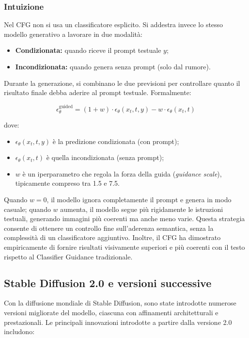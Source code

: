 \subsubsection{Intuizione}

Nel CFG non si usa un classificatore esplicito. Si addestra invece lo stesso modello generativo a lavorare in due modalità:
\begin{itemize}
    \item \textbf{Condizionata:} quando riceve il prompt testuale $y$;
    \item \textbf{Incondizionata:} quando genera senza prompt (solo dal rumore).
\end{itemize}
Durante la generazione, si combinano le due previsioni per controllare quanto il risultato finale debba aderire al prompt testuale. Formalmente:

\begin{equation}
    \epsilon_\theta^{\operatorname{guided}} = (1 + w)\cdot\epsilon_\theta(x_t,t,y) - w\cdot\epsilon_\theta(x_t,t)
\end{equation}

dove:
\begin{itemize}
    \item $\epsilon_\theta(x_t,t,y)$ è la predizione condizionata (con prompt);
    \item $\epsilon_\theta(x_t,t)$ è quella incondizionata (senza prompt);
    \item $w$ è un iperparametro che regola la forza della guida (\textit{guidance scale}), tipicamente compreso tra 1.5 e 7.5.
\end{itemize}

Quando $w = 0$, il modello ignora completamente il prompt e genera in modo casuale; quando $w$ aumenta, il modello segue più rigidamente le istruzioni testuali, generando immagini più coerenti ma anche meno varie. Questa strategia consente di ottenere un controllo fine sull’aderenza semantica, senza la complessità di un classificatore aggiuntivo. Inoltre, il CFG ha dimostrato empiricamente di fornire risultati visivamente superiori e più coerenti con il testo rispetto al Classifier Guidance tradizionale.

\subsection{Stable Diffusion 2.0 e versioni successive}
Con la diffusione mondiale di Stable Diffusion, sono state introdotte numerose versioni migliorate del modello, ciascuna con affinamenti architetturali e prestazionali. Le principali innovazioni introdotte a partire dalla versione 2.0 includono:

